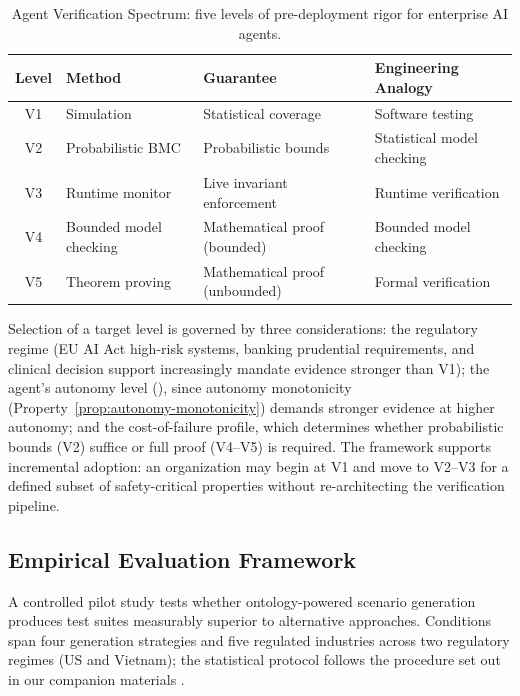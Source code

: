 \documentclass[11pt,a4paper]{article}
\begin{document}
\begin{table}[htbp]
\centering
\caption{Agent Verification Spectrum: five levels of pre-deployment
  rigor for enterprise AI agents.}
\label{tab:verification-spectrum}
\begin{tabular}{@{}clp{4cm}l@{}}
\toprule
\textbf{Level} & \textbf{Method} & \textbf{Guarantee} &
  \textbf{Engineering Analogy} \\
\midrule
V1 & Simulation             & Statistical coverage          & Software testing \\
V2 & Probabilistic BMC      & Probabilistic bounds          & Statistical model checking \\
V3 & Runtime monitor        & Live invariant enforcement    & Runtime verification \\
V4 & Bounded model checking & Mathematical proof (bounded)  & Bounded model checking \\
V5 & Theorem proving        & Mathematical proof (unbounded)& Formal verification \\
\bottomrule
\end{tabular}
\end{table}

Selection of a target level is governed by three considerations:
the regulatory regime (EU AI Act high-risk systems, banking
prudential requirements, and clinical decision support increasingly
mandate evidence stronger than V1); the agent's autonomy level
(), since autonomy monotonicity
(Property~\ref{prop:autonomy-monotonicity}) demands stronger
evidence at higher autonomy; and the cost-of-failure profile, which
determines whether probabilistic bounds (V2) suffice or full proof
(V4--V5) is required. The framework supports incremental adoption:
an organization may begin at V1 and move to V2--V3 for a defined
subset of safety-critical properties without re-architecting the
verification pipeline.

\subsection{Empirical Evaluation Framework}
\label{sec:empirical}

A controlled pilot study tests whether ontology-powered scenario
generation produces test suites measurably superior to alternative
approaches. Conditions span four generation strategies and five
regulated industries across two regulatory regimes (US and Vietnam);
the statistical protocol follows the procedure set out in our
companion materials \citep{luong2026neurosymbolic}.
\end{document}
